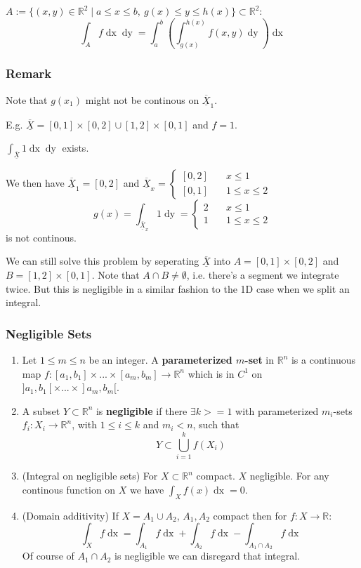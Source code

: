 \documentclass[a4paper,fontsize = 10pt]{article}
\def\R{\mathbb{R}}
\def\X{\underline{\overline{X}}}
\begin{document}
$A := \{(x,y)\in \R^2 \mid a \leq x \leq b, \ g(x) \leq y \leq h(x)\} \subset \R^2$:
\[\int_A f \mathop{dx}\mathop{dy} = \int_{a}^{b} \left(\int_{g(x)}^{h(x)}f(x,y) \mathop{dy}\right)\mathop{dx}\]

\subsubsection*{Remark}
Note that $g(x_1)$ might not be continous on $\X_1$. 

E.g. $\X = [0, 1] \times [0, 2] \cup [1, 2] \times [0, 1]$ and $f = 1$.

\(\int_{\X}1\mathop{dx}\mathop{dy}\) exists. 

We then have $\X_1 = [0,2]$ and $ \X_{x} = 
\begin{cases}
   [0,2] \quad& x \leq 1\\
   [0,1] \quad& 1 \leq x \leq 2
\end{cases}
$
\[
     g(x)= \int_{\X_x}1 \mathop{dy} = 
    \begin{cases}
        2 \quad& x \leq 1\\
        1 \quad& 1 \leq x \leq 2
    \end{cases}
\]
is not continous.

We can still solve this problem by seperating $\X$ into $A = [0, 1] \times [0,2]$ and $B = [1,2] \times [0,1]$. Note that $A \cap B \neq \emptyset$, i.e. there's a segment we integrate twice. But this is negligible in a similar fashion to the 1D case when we split an integral.

\subsubsection{Negligible Sets}
\begin{enumerate}
    \item Let $1 \leq m \leq n$ be an integer. A \textbf{parameterized $m$-set} in $\R^n$ is a continuous map $f: [a_1,b_1] \times ... \times [a_m,b_m] \to \R^n$ which is in $C^1$ on $]a_1,b_1[ \times ... \times ]a_m, b_m[.$
    \item A subset $Y \subset \R^n$ is \textbf{negligible} if there $\exists k >= 1$ with parameterized $m_i$-sets $f_i: X_i \to \R^n$, with $1 \leq i \leq k$ and $m_i < n$, such that \[Y \subset \bigcup_{i = 1}^{k}f(X_i)\] 
    \item (Integral on negligible sets) For $X \subset \R^n$ compact. $X$ negligible. For any continous function on $X$ we have $\int_{X}f(x)\mathop{dx} = 0$.
    \item (Domain additivity) If $X = A_1 \cup A_2$, $A_1, A_2$ compact then for $f: X \to \R$: 
    \[\int_X f\mathop{dx} = \int_{A_1}f\mathop{dx} + \int_{A_2}f\mathop{dx} -\int_{A_1 \cap A_2}f\mathop{dx}\]
    Of course of $A_1 \cap A_2$ is negligible we can disregard that integral.
\end{enumerate}
\end{document}
